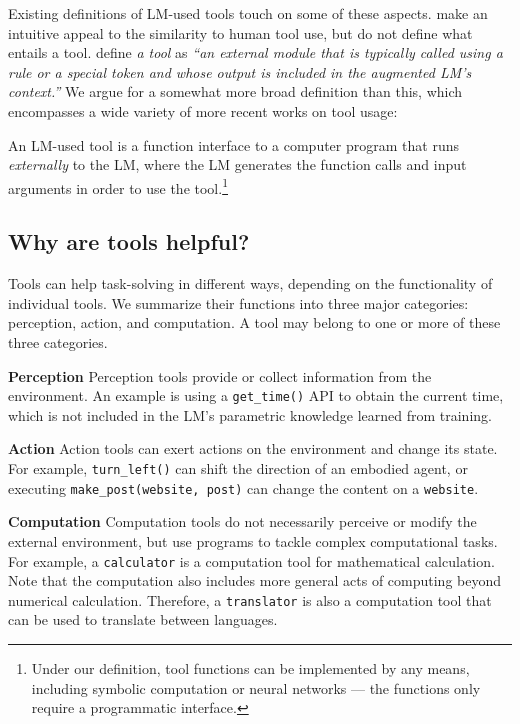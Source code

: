 Existing definitions of LM-used tools touch on some of these aspects. 
\citet{qin2023tool} make an intuitive appeal to the similarity to human tool use, but do not define what entails a tool.
\citet{mialon2023augmented} define \textit{a tool} as \textit{``an external module that is typically called using a rule or a special token and whose output is included in the augmented LM's context.''}
We argue for a somewhat more broad definition than this, which encompasses a wide variety of more recent works on tool usage:

\begin{definition}
  \label{def:tools-lm}
  An LM-used tool is a function interface to a computer program that runs \textit{externally} to the LM, where the LM generates the function calls and input arguments in order to use the tool.\footnote{Under our definition, tool functions can be implemented by any means, including symbolic computation or neural networks --- the functions only require a programmatic interface.}
\end{definition} 


\subsection{Why are tools helpful?}
Tools can help task-solving in different ways, depending on the functionality of individual tools. We summarize their functions into three major categories: perception, action, and computation. A tool may belong to one or more of these three categories.

\noindent \textbf{Perception} \quad
Perception tools provide or collect information from the environment. An example is using a \texttt{get\_time()} API to obtain the current time, which is not included in the LM's parametric knowledge learned from training.

\noindent \textbf{Action} \quad
Action tools can exert actions on the environment and change its state. For example, \texttt{turn\_left()} can shift the direction of an embodied agent, or executing \texttt{make\_post(website, post)} can change the content on a \texttt{website}.

\noindent \textbf{Computation} \quad
Computation tools do not necessarily perceive or modify the external environment, but use programs to tackle complex computational tasks. For example, a \texttt{calculator} is a computation tool for mathematical calculation.
Note that the computation also includes more general acts of computing beyond numerical calculation. Therefore, a \texttt{translator} is also a computation tool that can be used to translate between languages.

